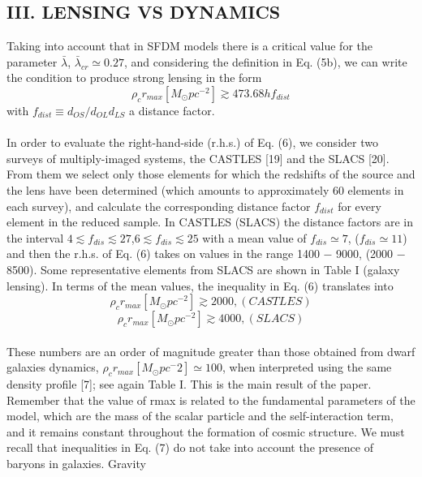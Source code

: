 \documentclass{article}
\begin{document}
\begin{multicols}{2}[]
\begin{center}
\section*{\normalsize{III. LENSING VS DYNAMICS}}
\end{center}
Taking into account that in SFDM models there is a
critical value for the parameter $\bar{\lambda}$, $\bar{\lambda}_{cr}\simeq0.27$, and considering the definition in Eq. (5b), we can write the condition to produce strong lensing in the form
\begin{equation}
    \rho_cr_{max}[M_\odot{pc^{-2}}]\gtrsim{473.68hf_{dist}}
\end{equation}
with $f_{dist} ≡ d_{OS}/d_{OL}d_{LS}$ a distance factor.
\\\\In order to evaluate the right-hand-side (r.h.s.) of
Eq. (6), we consider two surveys of multiply-imaged systems, the CASTLES [19] and the SLACS [20]. From
them we select only those elements for which the redshifts of the source and the lens have been determined
(which amounts to approximately 60 elements in each
survey), and calculate the corresponding distance factor $f_{dist}$ for every element in the reduced sample. In
CASTLES (SLACS) the distance factors are in the interval $4{\lesssim}f_{dis}\lesssim 27$,$6\lesssim{f_{dis}\lesssim25}$ with a mean value
of $f_{dis}\simeq7$, ($f_{dis}\simeq11$) and then the r.h.s. of Eq. (6)
takes on values in the range 1400 − 9000, (2000 − 8500).
Some representative elements from SLACS are shown in
Table I (galaxy lensing). In terms of the mean values,
the inequality in Eq. (6) translates into
\begin{equation}
    \rho_cr_{max}[M_\odot{pc^{-2}}]\gtrsim{2000}, (CASTLES)
\end{equation}
\begin{equation}
    \rho_cr_{max}[M_\odot{pc^{-2}}]\gtrsim{4000}, (SLACS)
\end{equation}
\\These numbers are an order of magnitude greater
than those obtained from dwarf galaxies dynamics, $\rho_cr_{max}[M_{\odot}pc^-2]\simeq100$, when interpreted using the same
density profile [7]; see again Table I. This is the main result of the paper. Remember that the value of rmax is related to the fundamental parameters of the model, which are the mass of the scalar particle and the self-interaction
term, and it remains constant throughout the formation
of cosmic structure.
We must recall that inequalities in Eq. (7) do not take
into account the presence of baryons in galaxies. Gravity

\end{multicols}
\end{document}

